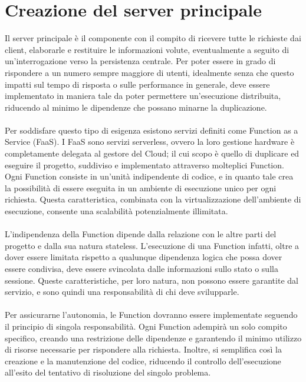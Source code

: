 \section{Creazione del server principale}

Il server principale è il componente con il compito di ricevere tutte le richieste dai client,
elaborarle e restituire le informazioni volute,
eventualmente a seguito di un'interrogazione verso la persistenza centrale.
Per poter essere in grado di rispondere a un numero sempre maggiore di utenti,
idealmente senza che questo impatti sul tempo di risposta o sulle performance in generale,
deve essere implementato in maniera tale da poter permettere un'esecuzione distribuita,
riducendo al minimo le dipendenze che possano minarne la duplicazione.\\
\\
Per soddisfare questo tipo di esigenza
esistono servizi definiti come Function as a Service (FaaS).
I FaaS sono servizi serverless,
ovvero la loro gestione hardware è completamente delegata al gestore del Cloud;
il cui scopo è quello di duplicare ed eseguire il progetto,
suddiviso e implementato attraverso molteplici Function.
Ogni Function consiste in un'unità indipendente di codice,
e in quanto tale crea la possibilità di essere eseguita in un ambiente di esecuzione unico per ogni richiesta.
Questa caratteristica, combinata con la virtualizzazione dell’ambiente di esecuzione,
consente una scalabilità potenzialmente illimitata.\\
\\
L’indipendenza della Function dipende dalla relazione con le altre parti del progetto e
dalla sua natura stateless.
L'esecuzione di una Function infatti,
oltre a dover essere limitata rispetto a qualunque dipendenza logica che possa dover essere condivisa,
deve essere svincolata dalle informazioni sullo stato o sulla sessione.
Queste caratteristiche, per loro natura, non possono essere garantite dal servizio,
e sono quindi una responsabilità di chi deve svilupparle.\\
\\
Per assicurarne l'autonomia,
le Function dovranno essere implementate seguendo il principio di singola responsabilità.
Ogni Function adempirà un solo compito specifico,
creando una restrizione delle dipendenze e
garantendo il minimo utilizzo di risorse necessarie per rispondere alla richiesta.
Inoltre, si semplifica così la creazione e la manutenzione del codice,
riducendo il controllo dell'esecuzione all'esito del tentativo di risoluzione del singolo problema.
\clearpage
